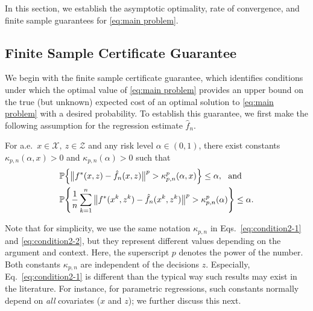 \documentclass[onefignum,onetabnum]{siamart251216}
\begin{document}
In this section, we establish the asymptotic optimality, rate of convergence, and finite sample guarantees for \eqref{eq:main problem}.

\subsection{Finite Sample Certificate Guarantee}
We begin with the finite sample certificate guarantee, which identifies conditions under which the optimal value of \eqref{eq:main problem} provides an upper bound on the true (but unknown) expected cost of an optimal solution to \eqref{eq:main problem} with a desired probability. To establish this guarantee, we first make the following assumption for the regression estimate $\hat{f}_n$.
\begin{assumption}\label{ass:regression}
    For a.e.\ $x \in \mathcal{X},\ z \in \mathcal{Z}$ and any risk level $\alpha \in (0,1)$, there exist constants $\kappa_{p,n}(\alpha,x) > 0$ and $\kappa_{p,n}(\alpha) > 0$ such that  
    \begin{align}
        &\mathbb{P}\Bigl\{\big\|f^*(x,z)-\hat{f}_n(x,z)\big\|^p > \kappa_{p,n}^p(\alpha,x)\Bigr\} \leq \alpha, \ \ \text{and}\label{eq:condition2-1}
        \\
        &\mathbb{P}\Biggl\{\frac{1}{n}\sum_{k=1}^n \big\|f^*(x^k,z^k)-\hat{f}_n(x^k,z^k)\big\|^p > \kappa_{p,n}^p(\alpha)\Biggr\} \leq \alpha.\label{eq:condition2-2}
    \end{align}
\end{assumption}
\noindent
Note that for simplicity, we use the same notation $\kappa_{p,n}$ in Eqs.~\eqref{eq:condition2-1} and \eqref{eq:condition2-2}, but they represent different values depending on the argument and context. Here, the superscript $p$ denotes the power of the number.  Both constants $\kappa_{p,n}$ are independent of the decisions $z$. Especially,  Eq.~\eqref{eq:condition2-1} is different than the typical way such results may exist in the literature. For instance, for parametric regressions, such constants normally depend on {\it all} covariates ($x$ and $z$); we further discuss this next.  
\end{document}
